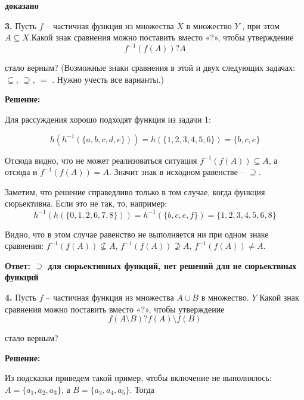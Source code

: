 \documentclass[a4paper,12pt]{article} %
\begin{document}
\begin{flushright}
\begin{large}
\textbf {доказано }
\end{large}
\end{flushright}


{\bf 3.} Пусть $f$ -- частичная функция из множества $X$ в множество $Y$ , при
этом $A \subseteq X$.Какой знак сравнения можно поставить вместо «?», чтобы
утверждение \[ f^{-1}(f(A))?A\]

стало верным? (Возможные знаки сравнения в этой и двух следующих
задачах: $\subseteq,\ \supseteq,\ =$ . Нужно учесть все варианты.)
\begin{center}
\bfseries
{\Large Решение: }
\end{center}

Для рассуждения хорошо подходят функция из задачи 1:

\[h(h^{-1}(\lbrace a,b,c,d,e\rbrace)) = h(\lbrace 1,2,3,4, 5,6\rbrace) = \lbrace b, c, e \rbrace\]

Отсюда видно, что не может реализоваться ситуация $f^{-1}(f(A)) \subseteq A$, а отсюда и $f^{-1}(f(A)) = A$. Значит знак в исходном равенстве -- $\supseteq$.

Заметим, что решение справедливо только в том случае, когда функция сюрьективна. Если это не так, то, например:
\[h^{-1}(h(\lbrace 0,1,2,6,7,8\rbrace)) = h^{-1}(\lbrace b,c,e,f \rbrace) = \lbrace 1,2,3,4,5,6,8 \rbrace\]

Видно, что в этом случае равенство не выполняется ни при одном знаке сравнения: $f^{-1}(f(A)) \nsubseteq A$, $f^{-1}(f(A)) \nsupseteq A$, $f^{-1}(f(A)) \neq A$.\\


\begin{flushright}
\begin{large}
\textbf {Ответ: $\supseteq$ для сюрьективных функций, нет решений для не сюрьектвных функций }
\end{large}
\end{flushright}
{\bf 4.} Пусть $f$ -- частичная функция из множества $A \cup B$ в множество. $Y$  Какой знак сравнения можно поставить вместо «?», чтобы утверждение \[ f(A \setminus B) ? f(A) \setminus f(B)\]

стало верным?
\begin{center}
\bfseries
{\Large Решение: }
\end{center}

Из подсказки приведем такой пример, чтобы включение не выполнялось: $A = \{a_1,a_2,a_3\}$, а $B = \{a_3,a_4,a_5\}$. Тогда 
\end{document}
